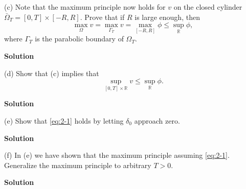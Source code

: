 \documentclass{article}
\begin{document}
(c) Note that the maximum principle now holds for $v$ on the closed
cylinder $\bar{\Omega}_T = [0, T] \times [-R, R]$. Prove that if $R$ is
large enough, then
%
\begin{equation*}
    \max_\Omega v = \max_{\Gamma_T} v = \max_{[-R, R]} \phi \leq \sup_\mathbb{R} \phi
    ,
\end{equation*}
%
where $\Gamma_T$ is the parabolic boundary of $\Omega_T$.

\textbf{Solution}

\vspace{5mm}

(d) Show that (c) implies that
%
\begin{equation*}
    \sup_{[0, T] \times \mathbb{R}} v \leq \sup_\mathbb{R} \phi
    .
\end{equation*}

\textbf{Solution}

\vspace{5mm}

(e) Show that \eqref{eq:2-1} holds by letting $\delta_0$ approach zero.

\textbf{Solution}

\vspace{5mm}

(f) In (e) we have shown that the maximum principle assuming
\eqref{eq:2-1}. Generalize the maximum principle to arbitrary $T > 0$.

\textbf{Solution}
\end{document}
